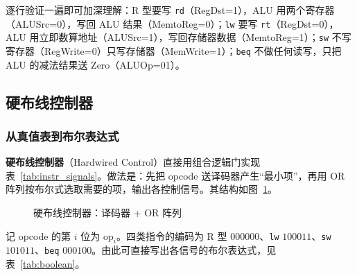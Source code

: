 逐行验证一遍即可加深理解：R 型要写 \texttt{rd}（RegDst=1），ALU 用两个寄存器（ALUSrc=0），写回 ALU 结果（MemtoReg=0）；\texttt{lw} 要写 \texttt{rt}（RegDst=0），ALU 用立即数算地址（ALUSrc=1），写回存储器数据（MemtoReg=1）；\texttt{sw} 不写寄存器（RegWrite=0）只写存储器（MemWrite=1）；\texttt{beq} 不做任何读写，只把 ALU 的减法结果送 Zero（ALUOp=01）。

\subsection{硬布线控制器}

\subsubsection{从真值表到布尔表达式}

\textbf{硬布线控制器}（Hardwired Control）直接用组合逻辑门实现表~\ref{tab:instr_signals}。做法是：先把 opcode 送译码器产生“最小项”，再用 OR 阵列按布尔式选取需要的项，输出各控制信号。其结构如图~\ref{fig:hardwired}。

\begin{figure}[H]
\centering
{}
\caption{硬布线控制器：译码器 + OR 阵列}
\label{fig:hardwired}
\end{figure}

记 opcode 的第 $i$ 位为 $\text{op}_i$。四类指令的编码为 R 型 $000000$、\texttt{lw} $100011$、\texttt{sw} $101011$、\texttt{beq} $000100$。由此可直接写出各信号的布尔表达式，见表~\ref{tab:boolean}。

